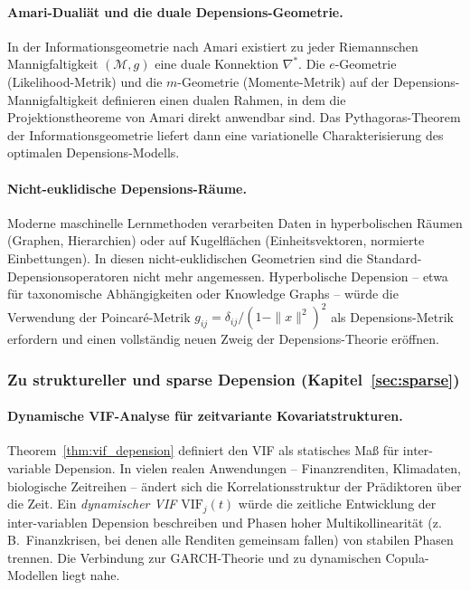 ﻿\documentclass[12pt, a4paper]{article}
\theoremstyle{definition}
\theoremstyle{remark}
\newcommand{\VIF}{\mathrm{VIF}}
\begin{document}
\paragraph{Amari-Dualiät und die duale Depensions-Geometrie.}
In der Informationsgeometrie nach Amari existiert zu jeder Riemannschen
Mannigfaltigkeit $({\mathcal{M}}, g)$ eine duale Konnektion $\nabla^*$.
Die $e$-Geometrie (Likelihood-Metrik) und die $m$-Geometrie (Momente-Metrik)
auf der Depensions-Mannigfaltigkeit definieren einen dualen Rahmen, in dem die
Projektionstheoreme von Amari direkt anwendbar sind. Das Pythagoras-Theorem der
Informationsgeometrie liefert dann eine variationelle Charakterisierung des
optimalen Depensions-Modells.

\paragraph{Nicht-euklidische Depensions-Räume.}
Moderne maschinelle Lernmethoden verarbeiten Daten in hyperbolischen Räumen
(Graphen, Hierarchien) oder auf Kugelflächen (Einheitsvektoren, normierte Einbettungen).
In diesen nicht-euklidischen Geometrien sind die Standard-Depensionsoperatoren
nicht mehr angemessen. Hyperbolische Depension -- etwa für taxonomische Abhängigkeiten
oder Knowledge Graphs -- würde die Verwendung der Poincaré-Metrik
$g_{ij} = \delta_{ij}/(1-\|x\|^2)^2$ als Depensions-Metrik erfordern und einen
vollständig neuen Zweig der Depensions-Theorie eröffnen.

\subsubsection{Zu struktureller und sparse Depension (Kapitel~\ref{sec:sparse})}

\paragraph{Dynamische VIF-Analyse für zeitvariante Kovariatstrukturen.}
Theorem~\ref{thm:vif_depension} definiert den VIF als statisches Maß für
inter-variable Depension. In vielen realen Anwendungen -- Finanzrenditen, Klimadaten,
biologische Zeitreihen -- ändert sich die Korrelationsstruktur der Prädiktoren über
die Zeit. Ein \emph{dynamischer VIF} $\VIF_j(t)$ würde die zeitliche Entwicklung der
inter-variablen Depension beschreiben und Phasen hoher Multikollinearität (z.\,B.\
Finanzkrisen, bei denen alle Renditen gemeinsam fallen) von stabilen Phasen trennen.
Die Verbindung zur GARCH-Theorie und zu dynamischen Copula-Modellen liegt nahe.
\end{document}
